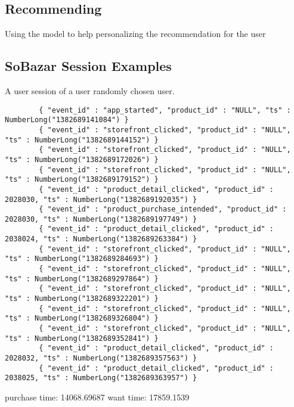 \subsection{Recommending}
    Using the model to help personalizing the recommendation for the user


\subsection{SoBazar Session Examples} %
    \label{par:session_examples}
    A user session of a user randomly chosen user.
    \begin{lstlisting}
        { "event_id" : "app_started", "product_id" : "NULL", "ts" : NumberLong("1382689141084") }
        { "event_id" : "storefront_clicked", "product_id" : "NULL", "ts" : NumberLong("1382689144152") }
        { "event_id" : "storefront_clicked", "product_id" : "NULL", "ts" : NumberLong("1382689172026") }
        { "event_id" : "storefront_clicked", "product_id" : "NULL", "ts" : NumberLong("1382689179152") }
        { "event_id" : "product_detail_clicked", "product_id" : 2028030, "ts" : NumberLong("1382689192035") }
        { "event_id" : "product_purchase_intended", "product_id" : 2028030, "ts" : NumberLong("1382689197749") }
        { "event_id" : "product_detail_clicked", "product_id" : 2038024, "ts" : NumberLong("1382689263384") }
        { "event_id" : "storefront_clicked", "product_id" : "NULL", "ts" : NumberLong("1382689284693") }
        { "event_id" : "storefront_clicked", "product_id" : "NULL", "ts" : NumberLong("1382689297864") }
        { "event_id" : "storefront_clicked", "product_id" : "NULL", "ts" : NumberLong("1382689322201") }
        { "event_id" : "storefront_clicked", "product_id" : "NULL", "ts" : NumberLong("1382689326804") }
        { "event_id" : "storefront_clicked", "product_id" : "NULL", "ts" : NumberLong("1382689352841") }
        { "event_id" : "product_detail_clicked", "product_id" : 2028032, "ts" : NumberLong("1382689357563") }
        { "event_id" : "product_detail_clicked", "product_id" : 2038025, "ts" : NumberLong("1382689363957") }
    \end{lstlisting}

    purchase time: 14068.69687
    want time: 17859.1539



